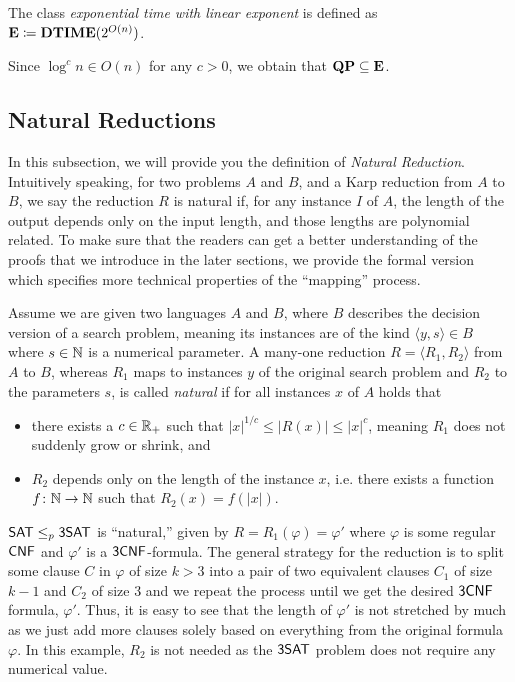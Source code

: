 \documentclass[11pt]{article}
\begin{document}
\begin{definition}
  The class \emph{exponential time with linear exponent} is defined as
	$\mathbf{E} \coloneqq \mathbf{DTIME}(2^{O(n)})$.
\end{definition}

Since $\log^c n \in O(n)$ for any $c > 0$, we obtain that
$\mathbf{QP} \subseteq \mathbf{E}$.


\subsection{Natural Reductions}

In this subsection, we will provide you the definition of \textit{Natural Reduction}. Intuitively speaking, for two problems $A$ and $B$, and a Karp reduction from $A$ to $B$, we say the reduction $R$ is natural if, for any instance $I$ of $A$, the length of the output depends only on the input length, and those lengths are polynomial related. To make sure that the readers can get a better understanding of the proofs that we introduce in the later sections, we provide the formal version which specifies more technical properties of the ``mapping'' process. 

\begin{definition}
  Assume we are given two languages $A$ and $B$, where $B$ describes the
  decision version of a search problem, meaning its instances are of the kind
  $\langle y, s \rangle \in B$ where $s \in {\mathbb{N}}$ is a numerical parameter.
  A many-one reduction $R = \langle R_1, R_2 \rangle$ from $A$ to $B$, whereas
  $R_1$ maps to instances $y$ of the original search problem and $R_2$ to the
  parameters $s$, is called \emph{natural} if for all instances $x$ of $A$ holds
  that
  \begin{itemize}
    \item there exists a $c \in {\mathbb R}_+$ such that
      $|x|^{1/c} \le |R(x)| \le |x|^c$, meaning $R_1$ does not suddenly grow or
      shrink, and
    \item $R_2$ depends only on the length of the instance $x$, i.e. there
      exists a function $f \colon {\mathbb{N}} \to {\mathbb{N}}$ such that $R_2(x) = f(|x|)$.
  \end{itemize}
\end{definition}
	
\begin{example}
	$\mathsf{SAT} \leq_p \mathsf{3SAT}$ is ``natural,'' given by $R = R_1(\varphi) = \varphi'$ where $\varphi$ is some regular $\mathsf{CNF}$ and $\varphi'$ is a $\mathsf{3CNF}$-formula. The general strategy for the reduction is to split some clause $C$ in $\varphi$ of size $k > 3$ into a pair of two equivalent clauses $C_1$ of size $k - 1$ and $C_2$ of size $3$ and we repeat the process until we get the desired $\mathsf{3CNF}$ formula, $\varphi'$. Thus, it is easy to see that the length of $\varphi'$ is not stretched by much as we just add more clauses solely based on everything from the original formula $\varphi$. In this example, $R_2$ is not needed as the $\mathsf{3SAT}$ problem does not require any numerical value.
\end{example}
\end{document}
